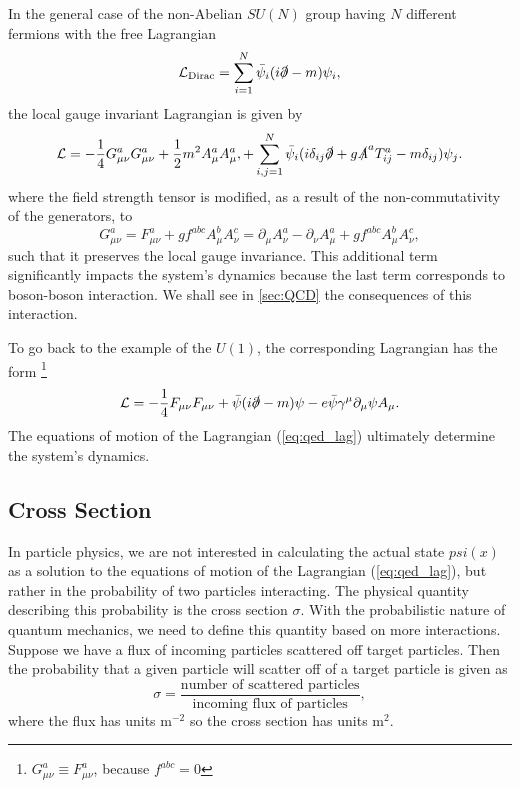 In the general case of the non-Abelian $SU(N)$ group having $N$ different fermions with the free Lagrangian
\begin{equation}
    \label{eq:Dirac_N}
    \mathcal{L}_{\text{Dirac}} = \sum_{i=1}^N \bar{\psi}_i (i\slashed{\partial} - m) \psi_i,
\end{equation}
the local gauge invariant Lagrangian is given by \cite{schartz}
\begin{equation}
    \label{eq:lag_suN}
    \mathcal{L} = - \frac{1}{4}  G^a_{\mu\nu} G^a_{\mu\nu} + \frac{1}{2} m^2 A^a_\mu A^a_\mu, + \sum_{i,j=1}^N \bar{\psi}_i (i\delta_{ij} \slashed{\partial}  +g \slashed{A}^a T^a_{ij} - m \delta_{ij}) \psi_j.
\end{equation}
where the field strength tensor is modified, as a result of the non-commutativity of the generators, to
\begin{equation}
    \label{eq:field_strength}
    G^a_{\mu\nu} = F^a_{\mu\nu} + g f^{abc} A^b_\mu A^c_\nu = \partial_\mu A^a_\nu - \partial_\nu A^a_\mu + g f^{abc} A^b_\mu A^c_\nu,
\end{equation}
such that it preserves the local gauge invariance.
This additional term significantly impacts the system's dynamics because the last term corresponds to boson-boson interaction.
We shall see in \cref{sec:QCD} the consequences of this interaction.

To go back to the example of the $U(1)$, the corresponding Lagrangian has the form \footnote{$G^a_{\mu\nu} \equiv F^a_{\mu\nu}$, because $f^{abc} = 0$}
\begin{equation}
    \label{eq:qed_lag}
    \mathcal{L} = - \frac{1}{4}  F_{\mu\nu} F_{\mu\nu} + \bar{\psi}(i\slashed{\partial} - m) \psi - e \bar{\psi} \gamma^\mu \partial_\mu \psi A_\mu.
\end{equation}
The equations of motion of the Lagrangian (\ref{eq:qed_lag}) ultimately determine the system's dynamics.

\subsection{Cross Section}
\label{sec:cross_section}
In particle physics, we are not interested in calculating the actual state $psi(x)$ as a solution to the equations of motion of the Lagrangian (\ref{eq:qed_lag}), but rather in the probability of two particles interacting. 
The physical quantity describing this probability is the cross section $\sigma$.
With the probabilistic nature of quantum mechanics, we need to define this quantity based on more interactions.
Suppose we have a flux of incoming particles scattered off target particles. 
Then the probability that a given particle will scatter off of a target particle is given as 
\begin{equation}
    \label{eq:cross_sec}
    \sigma = \frac{\text{number of scattered particles}}{\text{incoming flux of particles}},
\end{equation}
where the flux has units m$^{-2}$ so the cross section has units m$^{2}$.

